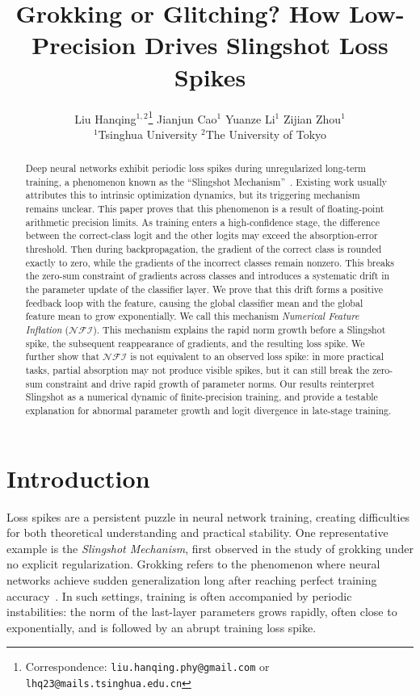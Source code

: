 \documentclass{article}
\title{Grokking or Glitching? How Low-Precision Drives Slingshot Loss Spikes}
\author{%
  Liu Hanqing$^{1,2}$\thanks{Correspondence: \texttt{liu.hanqing.phy@gmail.com} or \texttt{lhq23@mails.tsinghua.edu.cn}} \quad 
    Jianjun Cao$^1$ \quad 
    Yuanze Li$^1$ \quad 
    Zijian Zhou$^1$ \\
    \small $^1$Tsinghua University \quad $^2$The University of Tokyo
}
\theoremstyle{plain}
\theoremstyle{definition}
\theoremstyle{remark}
\begin{document}


\maketitle


\begin{abstract}
  Deep neural networks exhibit periodic loss spikes during unregularized long-term training, a phenomenon known as the ``Slingshot Mechanism''~\cite{thilak2022}.
  Existing work usually attributes this to intrinsic optimization dynamics, but its triggering mechanism remains unclear. 
  This paper proves that this phenomenon is a result of floating-point arithmetic precision limits.
  As training enters a high-confidence stage, the difference between the correct-class logit and 
  the other logits may exceed the absorption-error threshold. Then during backpropagation, 
  the gradient of the correct class is rounded exactly to zero, while the gradients of the incorrect classes remain nonzero. 
  This breaks the zero-sum constraint of gradients across classes and 
  introduces a systematic drift in the parameter update of the classifier layer. 
  We prove that this drift forms a positive feedback loop with the feature, 
  causing the global classifier mean and the global feature mean to grow exponentially. 
  We call this mechanism \emph{Numerical Feature Inflation} ($\mathcal{NFI}$). This mechanism explains the rapid norm growth before a Slingshot spike, 
  the subsequent reappearance of gradients, and the resulting loss spike. We further show that $\mathcal{NFI}$ is not equivalent to 
  an observed loss spike: in more practical tasks, partial absorption may not produce visible spikes, 
  but it can still break the zero-sum constraint and drive rapid growth of parameter norms.
  Our results reinterpret Slingshot as a numerical dynamic of finite-precision training, 
  and provide a testable explanation for abnormal parameter growth and logit divergence in late-stage training.
\end{abstract}




\section{Introduction}

Loss spikes are a persistent puzzle in neural network training, creating difficulties for both theoretical understanding and practical stability. 
One representative example is the \emph{Slingshot Mechanism}, first observed in the study of grokking under no explicit regularization. 
Grokking refers to the phenomenon where neural networks achieve sudden generalization long after reaching perfect training accuracy~\cite{power2022}. 
In such settings, training is often accompanied by periodic instabilities: 
the norm of the last-layer parameters grows rapidly, often close to exponentially, 
and is followed by an abrupt training loss spike.
\end{document}

